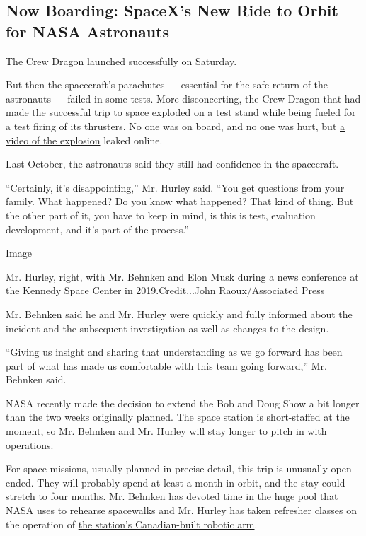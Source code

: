 \hypertarget{now-boarding-spacexs-new-ride-to-orbit-for-nasa-astronauts}{%
\subsection{Now Boarding: SpaceX's New Ride to Orbit for NASA
Astronauts}\label{now-boarding-spacexs-new-ride-to-orbit-for-nasa-astronauts}}

The Crew Dragon launched successfully on Saturday.

But then the spacecraft's parachutes --- essential for the safe return
of the astronauts --- failed in some tests. More disconcerting, the Crew
Dragon that had made the successful trip to space exploded on a test
stand while being fueled for a test firing of its thrusters. No one was
on board, and no one was hurt, but \href{https://youtu.be/scz-fFZT-dI}{a
video of the explosion} leaked online.

Last October, the astronauts said they still had confidence in the
spacecraft.

``Certainly, it's disappointing,'' Mr. Hurley said. ``You get questions
from your family. What happened? Do you know what happened? That kind of
thing. But the other part of it, you have to keep in mind, is this is
test, evaluation development, and it's part of the process.''

Image

Mr. Hurley, right, with Mr. Behnken and Elon Musk during a news
conference at the Kennedy Space Center in 2019.Credit...John
Raoux/Associated Press

Mr. Behnken said he and Mr. Hurley were quickly and fully informed about
the incident and the subsequent investigation as well as changes to the
design.

``Giving us insight and sharing that understanding as we go forward has
been part of what has made us comfortable with this team going
forward,'' Mr. Behnken said.

NASA recently made the decision to extend the Bob and Doug Show a bit
longer than the two weeks originally planned. The space station is
short-staffed at the moment, so Mr. Behnken and Mr. Hurley will stay
longer to pitch in with operations.

For space missions, usually planned in precise detail, this trip is
unusually open-ended. They will probably spend at least a month in
orbit, and the stay could stretch to four months. Mr. Behnken has
devoted time in
\href{https://www.nasa.gov/image-feature/neutral-buoyancy-laboratory}{the
huge pool that NASA uses to rehearse spacewalks} and Mr. Hurley has
taken refresher classes on the operation of
\href{https://www.asc-csa.gc.ca/eng/iss/canadarm2/default.asp}{the
station's Canadian-built robotic arm}.

